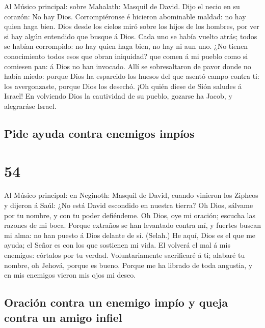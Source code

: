  Al Músico principal: sobre Mahalath: Masquil de David. Dijo
el necio en su corazón: No hay Dios. Corrompiéronse é hicieron
abominable maldad: no hay quien haga bien.  Dios desde los
cielos miró sobre los hijos de los hombres, por ver si hay algún
entendido que busque á Dios.  Cada uno se había vuelto
atrás; todos se habían corrompido: no hay quien haga bien, no hay ni aun
uno.  ¿No tienen conocimiento todos esos que obran
iniquidad? que comen á mi pueblo como si comiesen pan: á Dios no han
invocado.  Allí se sobresaltaron de pavor donde no había
miedo: porque Dios ha esparcido los huesos del que asentó campo contra
ti: los avergonzaste, porque Dios los desechó.  ¡Oh quién
diese de Sión saludes á Israel! En volviendo Dios la cautividad de su
pueblo, gozarse ha Jacob, y alegraráse Israel.

\hypertarget{pide-ayuda-contra-enemigos-impuxedos}{%
\subsection{Pide ayuda contra enemigos
impíos}\label{pide-ayuda-contra-enemigos-impuxedos}}

\hypertarget{section-53}{%
\section{54}\label{section-53}}

 Al Músico principal: en Neginoth: Masquil de David, cuando
vinieron los Zipheos y dijeron á Saúl: ¿No está David escondido en
nuestra tierra? Oh Dios, sálvame por tu nombre, y con tu poder
defiéndeme.  Oh Dios, oye mi oración; escucha las razones de
mi boca.  Porque extraños se han levantado contra mí, y
fuertes buscan mi alma: no han puesto á Dios delante de sí. (Selah.)
 He aquí, Dios es el que me ayuda; el Señor es con los que
sostienen mi vida.  El volverá el mal á mis enemigos:
córtalos por tu verdad.  Voluntariamente sacrificaré á ti;
alabaré tu nombre, oh Jehová, porque es bueno.  Porque me ha
librado de toda angustia, y en mis enemigos vieron mis ojos mi deseo.

\hypertarget{oraciuxf3n-contra-un-enemigo-impuxedo-y-queja-contra-un-amigo-infiel}{%
\subsection{Oración contra un enemigo impío y queja contra un amigo
infiel}\label{oraciuxf3n-contra-un-enemigo-impuxedo-y-queja-contra-un-amigo-infiel}}

